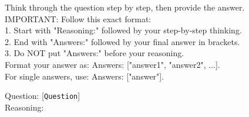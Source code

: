 \begin{tcolorbox}[colback=white, colframe=black, title=Prompte template for CoT setup, boxrule=0.5pt, left=2mm, right=2mm, top=0mm, bottom=0.5mm]
\footnotesize
\label{tab:instruction_prompt}
Think through the question step by step, then provide the answer.\\
IMPORTANT: Follow this exact format: \\
1. Start with "Reasoning:" followed by your step-by-step thinking.\\
2. End with "Answers:" followed by your final answer in brackets.\\
3. Do NOT put "Answers:" before your reasoning.\\[0.25em]
Format your answer as: Answers: ["answer1", "answer2", ...]. \\
For single answers, use: Answers: ["answer"]. 

Question: [\texttt{Question}]\\
Reasoning:
\end{tcolorbox}
